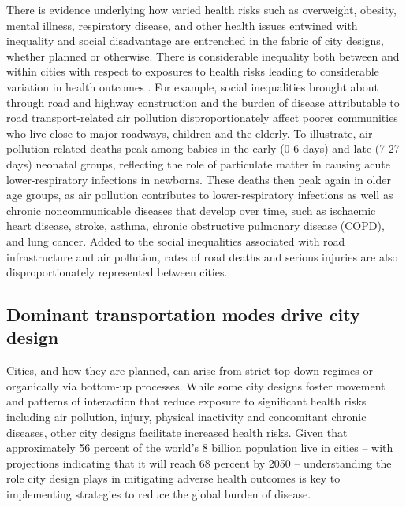 \documentclass[preprint,10pt]{elsarticle} %
\begin{document}
There is evidence underlying how varied health risks such as overweight, obesity, mental illness, respiratory disease, and other health issues entwined with inequality and social disadvantage are entrenched in the fabric of city designs, whether planned or otherwise\cite{borrell2013factors,xing2016impact,yuchi2020road}. There is considerable inequality both between and within cities with respect to exposures to health risks leading to considerable variation in health outcomes \cite{KRISHNA2021102046}. For example, social inequalities brought about through road and highway construction\cite{carpenter2010poverty,archer2020white} and the burden of disease attributable to road transport-related air pollution disproportionately affect poorer communities who live close to major roadways, children and the elderly. To illustrate, air pollution-related deaths peak among babies in the early (0-6 days) and late (7-27 days) neonatal groups, reflecting the role of particulate matter in causing acute lower-respiratory infections in newborns. These deaths then peak again in older age groups, as air pollution contributes to lower-respiratory infections as well as chronic noncommunicable diseases that develop over time, such as ischaemic heart disease, stroke, asthma, chronic obstructive pulmonary disease (COPD), and lung cancer\cite{boogaard2022long}. Added to the social inequalities associated with road infrastructure and air pollution, rates of road deaths and serious injuries are also disproportionately represented between cities\cite{Thompson2020}.

\subsection*{Dominant transportation modes drive city design}
Cities, and how they are planned, can arise from strict top-down regimes\cite{mundigo1977city} or organically via bottom-up processes\cite{batty2017thinking, dovey2023atlas}. While some city designs foster movement and patterns of interaction that reduce exposure to significant health risks including air pollution, injury, physical inactivity and concomitant chronic diseases, other city designs facilitate increased health risks\cite{Wijnands2022, Stevenson2016,wang2023flood, stanley2022managing}. Given that approximately 56 percent of the world's 8 billion population live in cities -- with projections indicating that it will reach 68 percent by 2050\cite{WHO2023}  -- understanding the role city design plays in mitigating adverse health outcomes is key to implementing strategies to reduce the global burden of disease. 
\end{document}
